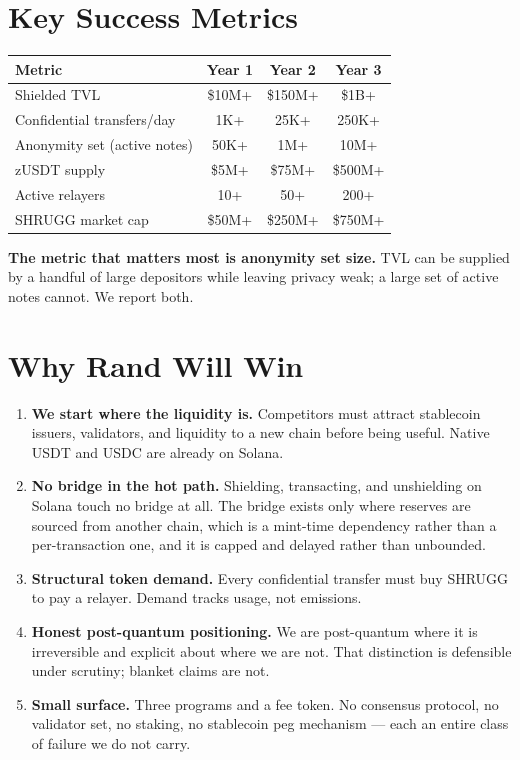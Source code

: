 \documentclass[11pt,a4paper]{article}
\begin{document}
\section{Key Success Metrics}

\begin{table}[h]
\centering
\begin{tabular}{@{}lccc@{}}
\toprule
\textbf{Metric} & \textbf{Year 1} & \textbf{Year 2} & \textbf{Year 3} \\ \midrule
Shielded TVL & \$10M+ & \$150M+ & \$1B+ \\
Confidential transfers/day & 1K+ & 25K+ & 250K+ \\
Anonymity set (active notes) & 50K+ & 1M+ & 10M+ \\
zUSDT supply & \$5M+ & \$75M+ & \$500M+ \\
Active relayers & 10+ & 50+ & 200+ \\
SHRUGG market cap & \$50M+ & \$250M+ & \$750M+ \\ \bottomrule
\end{tabular}
\end{table}

\textbf{The metric that matters most is anonymity set size.} TVL can be supplied by a handful of large depositors while leaving privacy weak; a large set of active notes cannot. We report both.

\section{Why Rand Will Win}

\begin{enumerate}[leftmargin=*]
    \item \textbf{We start where the liquidity is.} Competitors must attract stablecoin issuers, validators, and liquidity to a new chain before being useful. Native USDT and USDC are already on Solana.
    \item \textbf{No bridge in the hot path.} Shielding, transacting, and unshielding on Solana touch no bridge at all. The bridge exists only where reserves are sourced from another chain, which is a mint-time dependency rather than a per-transaction one, and it is capped and delayed rather than unbounded.
    \item \textbf{Structural token demand.} Every confidential transfer must buy SHRUGG to pay a relayer. Demand tracks usage, not emissions.
    \item \textbf{Honest post-quantum positioning.} We are post-quantum where it is irreversible and explicit about where we are not. That distinction is defensible under scrutiny; blanket claims are not.
    \item \textbf{Small surface.} Three programs and a fee token. No consensus protocol, no validator set, no staking, no stablecoin peg mechanism --- each an entire class of failure we do not carry.
\end{enumerate}
\end{document}
